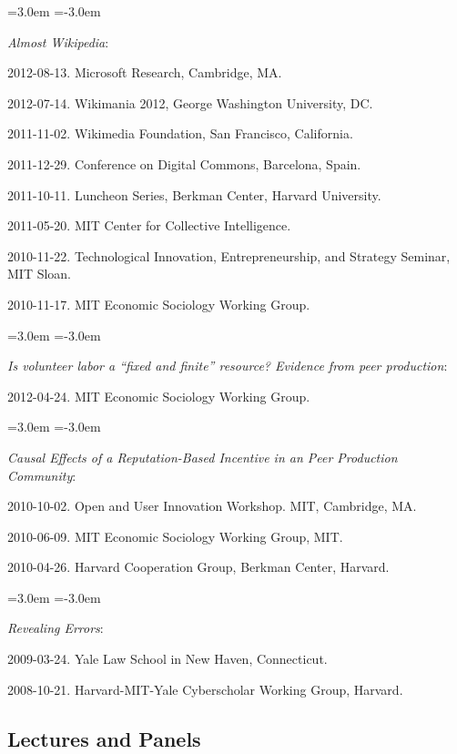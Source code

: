 \documentclass[10pt]{article}
\newenvironment{cvlist}{
\begin{list}{}{\leftmargin=3.0em \itemindent=-3.0em}
  \setlength{\itemsep}{0pt}
  \setlength{\parskip}{0em}
  \setlength{\parsep}{1em}
  \setlength{\parindent}{0em}}
{\vspace{1em}
\end{list}}
\begin{document}
\begin{cvlist}
\item \emph{Almost Wikipedia}:
\item 2012-08-13. Microsoft Research, Cambridge, MA.
\item 2012-07-14. Wikimania 2012, George Washington University, DC.
\item 2011-11-02. Wikimedia Foundation, San Francisco, California.
\item 2011-12-29. Conference on Digital Commons, Barcelona, Spain.
\item 2011-10-11. Luncheon Series, Berkman Center, Harvard University.
\item 2011-05-20. MIT Center for Collective Intelligence.
\item 2010-11-22. Technological Innovation, Entrepreneurship, and Strategy Seminar, MIT Sloan.
\item 2010-11-17. MIT Economic Sociology Working Group.
\end{cvlist}

\begin{cvlist}
\item \emph{Is volunteer labor a ``fixed and finite'' resource?  Evidence
  from peer production}:
\item 2012-04-24. MIT Economic Sociology Working Group.
\end{cvlist}

\begin{cvlist}
\item \emph{Causal Effects of a Reputation-Based Incentive in an Peer Production Community}:
\item 2010-10-02. Open and User Innovation Workshop. MIT, Cambridge, MA.
\item 2010-06-09. MIT Economic Sociology Working Group, MIT.
\item 2010-04-26. Harvard Cooperation Group, Berkman Center, Harvard.
\end{cvlist}

\begin{cvlist}
\item \emph{Revealing Errors}:
\item 2009-03-24. Yale Law School in New Haven, Connecticut.
\item 2008-10-21. Harvard-MIT-Yale Cyberscholar Working Group, Harvard.
\end{cvlist}

\subsection{Lectures and Panels}
\end{document}
